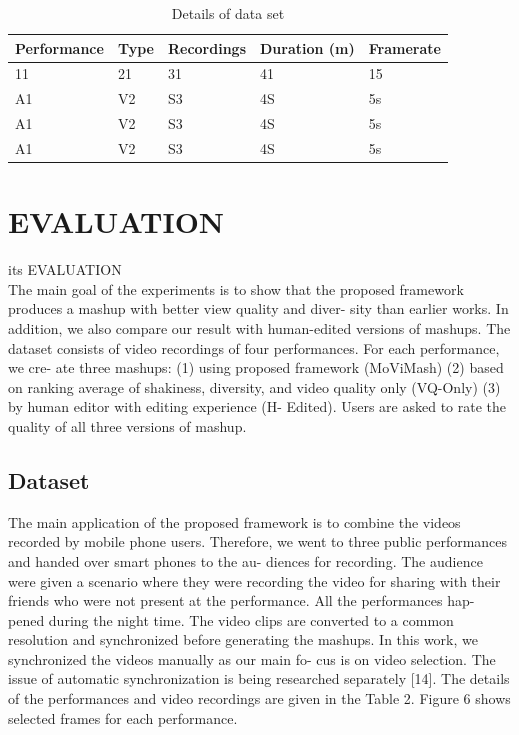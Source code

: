 \documentclass{sig-alternate}
\begin{document}
\begin{table}
\centering
\caption{ Details of data set }
\begin{tabular}{p{1.2cm}|p{1.2cm}|p{1.2cm}|p{1.2cm}|l} \hline
Performance&Type&Recordings&Duration 
(m)&Framerate\\ \hline
11&21&31&41&15\\ \hline
A1&V2&S3&4S&5s\\ \hline
A1&V2&S3&4S&5s\\ \hline
A1&V2&S3&4S&5s\\ \hline
\end{tabular}
\end{table}

\section{EVALUATION}
its EVALUATION \\
The main goal of the experiments is to show that the proposed
framework produces a mashup with better view quality and diver-
sity than earlier works. In addition, we also compare our result with
human-edited versions of mashups. The dataset consists of video
recordings of four performances. For each performance, we cre-
ate three mashups: (1) using proposed framework (MoViMash) (2)
based on ranking average of shakiness, diversity, and video quality only (VQ-Only) (3) by human editor with editing experience (H-
Edited). Users are asked to rate the quality of all three versions of
mashup.


\subsection{Dataset}
The main application of the proposed framework is to combine
the videos recorded by mobile phone users. Therefore, we went to
three public performances and handed over smart phones to the au-
diences for recording. The audience were given a scenario where
they were recording the video for sharing with their friends who
were not present at the performance. All the performances hap-
pened during the night time. The video clips are converted to a
common resolution and synchronized before generating the mashups.
In this work, we synchronized the videos manually as our main fo-
cus is on video selection. The issue of automatic synchronization is
being researched separately [14]. The details of the performances
and video recordings are given in the Table 2. Figure 6 shows selected frames for each performance.
\end{document}
